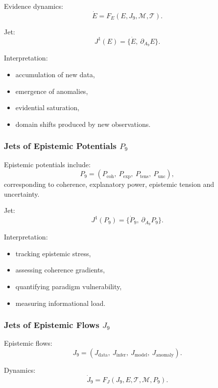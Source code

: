 Evidence dynamics:
\[
\dot{E}=F_E(E,J_9,\mathcal{M},\mathcal{T}).
\]

Jet:
\[
J^1(E)=\{\dot{E},\ \partial_{A_9}E\}.
\]

Interpretation:
\begin{itemize}
    \item accumulation of new data,
    \item emergence of anomalies,
    \item evidential saturation,
    \item domain shifts produced by new observations.
\end{itemize}


\subsubsection{Jets of Epistemic Potentials \texorpdfstring{$P_9$}{P_9}}

Epistemic potentials include:
\[
P_9=
(P_{\mathrm{coh}},\ 
 P_{\mathrm{exp}},\ 
 P_{\mathrm{tens}},\ 
 P_{\mathrm{unc}}),
\]
corresponding to coherence, explanatory power, epistemic tension and
uncertainty.

Jet:
\[
J^1(P_9)=\{\dot{P}_9,\ \partial_{A_9}P_9\}.
\]

Interpretation:
\begin{itemize}
    \item tracking epistemic stress,
    \item assessing coherence gradients,
    \item quantifying paradigm vulnerability,
    \item measuring informational load.
\end{itemize}


\subsubsection{Jets of Epistemic Flows \texorpdfstring{$J_9$}{J_9}}

Epistemic flows:
\[
J_9=
(J_{\mathrm{data}},\ 
 J_{\mathrm{infer}},\ 
 J_{\mathrm{model}},\ 
 J_{\mathrm{anomaly}}).
\]

Dynamics:
\[
\dot{J}_9 = 
F_J(J_9,E,\mathcal{T},\mathcal{M},P_9).
\]

